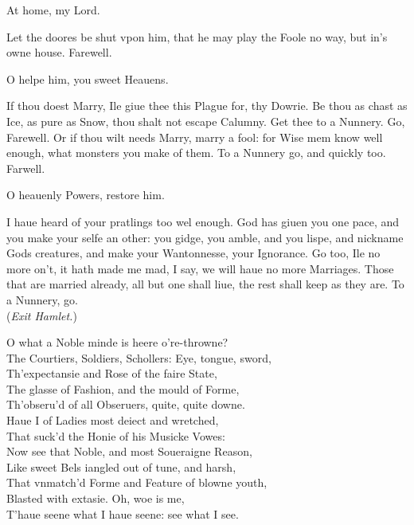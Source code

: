 \documentclass[a5paper,DIV=calc,11pt]{scrbook}
\begin{document}
\begin{drama*}
    \ophespeaks At home, my Lord.
    
    \hamspeaks Let the doores be shut vpon him, that he may play the Foole no way, but in's owne house. Farewell.
    
    \ophespeaks O helpe him, you sweet Heauens.
    
    \hamspeaks If thou doest Marry, Ile giue thee this Plague for, thy Dowrie. Be thou as chast as Ice, as pure as Snow, thou shalt not escape Calumny. Get thee to a Nunnery. Go, Farewell. Or if thou wilt needs Marry, marry a fool: for Wise mem know well enough, what monsters you make of them. To a Nunnery go, and quickly too. Farwell.
    
    \ophespeaks O heauenly Powers, restore him.
    
    \hamspeaks I haue heard of your pratlings too wel enough. God has giuen you one pace, and you make your selfe an other: you gidge, you amble, and you lispe, and nickname Gods creatures, and make your Wantonnesse, your Ignorance. Go too, Ile no more on't, it hath made me mad, I say, we will haue no more Marriages. Those that are married already, all but one shall liue, the rest shall keep as they are. To a Nunnery, go.\\
    (\textit{Exit Hamlet.})
    
    \ophespeaks O what a Noble minde is heere o're-throwne?\\
    The Courtiers, Soldiers, Schollers: Eye, tongue, sword,\\
    Th'expectansie and Rose of the faire State,\\
    The glasse of Fashion, and the mould of Forme,\\
    Th'obseru'd of all Obseruers, quite, quite downe.\\
    Haue I of Ladies most deiect and wretched,\\
    That suck'd the Honie of his Musicke Vowes:\\
    Now see that Noble, and most Soueraigne Reason,\\
    Like sweet Bels iangled out of tune, and harsh,\\
    That vnmatch'd Forme and Feature of blowne youth,\\
    Blasted with extasie. Oh, woe is me,\\
    T'haue seene what I haue seene: see what I see.
    
    

\end{drama*}
\end{document}
